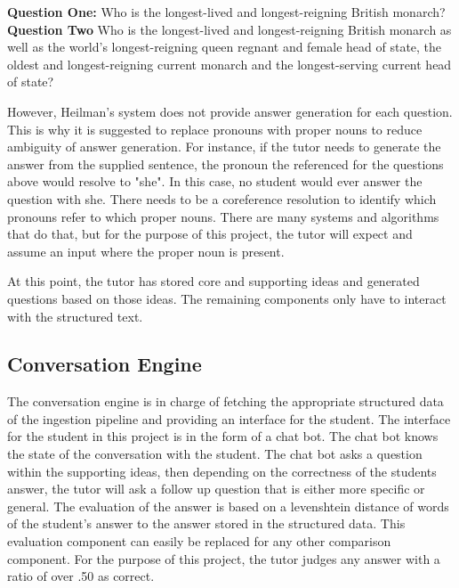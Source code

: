 \documentclass{sigchi}
\begin{document}
  \begin{addmargin}[1em]{2em}
    \textbf{Question One:} Who is the longest-lived and longest-reigning British monarch? \\
    \textbf{Question Two} Who is the longest-lived and longest-reigning British monarch as well as the world's longest-reigning queen regnant and female head of state, the oldest and longest-reigning current monarch and the longest-serving current head of state? \\
  \end{addmargin}

  However, Heilman's system does not provide answer generation for each question. This is why it is suggested to replace pronouns with proper nouns to reduce ambiguity of answer generation. For instance, if the tutor needs to generate the answer from the supplied sentence, the pronoun the referenced for the questions above would resolve to "she". In this case, no student would ever answer the question with she. There needs to be a coreference resolution to identify which pronouns refer to which proper nouns. There are many systems and algorithms that do that, but for the purpose of this project, the tutor will expect and assume an input where the proper noun is present.

  At this point, the tutor has stored core and supporting ideas and generated questions based on those ideas. The remaining components only have to interact with the structured text.


  \subsection{Conversation Engine}

  The conversation engine is in charge of fetching the appropriate structured data of the ingestion pipeline and providing an interface for the student. The interface for the student in this project is in the form of a chat bot. The chat bot knows the state of the conversation with the student. The chat bot asks a question within the supporting ideas, then depending on the correctness of the students answer, the tutor will ask a follow up question that is either more specific or general. The evaluation of the answer is based on a levenshtein distance of words of the student's answer to the answer stored in the structured data. This evaluation component can easily be replaced for any other comparison component. For the purpose of this project, the tutor judges any answer with a ratio of over .50 as correct.
\end{document}

